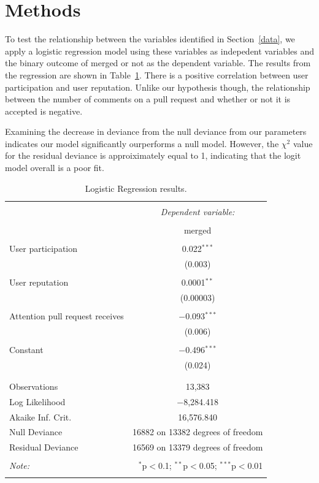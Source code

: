 \documentclass[12pt]{article}
\begin{document}
\section{Methods}\label{methods}
To test the relationship between the variables identified in Section~\ref{data},
we apply a logistic regression model using these variables as indepedent
variables and the binary outcome of merged or not as the dependent variable. The
results from the regression are shown in Table~\ref{logit}. There is a positive
correlation between user participation and user reputation. Unlike our
hypothesis though, the relationship between the number of comments on a pull
request and whether or not it is accepted is negative.

Examining the decrease in deviance from the null deviance from our parameters
indicates our model significantly ourperforms a null model. However, the
$\chi^{2}$ value for the residual deviance is approiximately equal to 1,
indicating that the logit model overall is a poor fit.


\begin{table}[!htbp] \centering
\caption{Logistic Regression results.}
\label{logit}
\begin{tabular}{@{\extracolsep{5pt}}lc}
\\[-1.8ex]\hline
\hline \\[-1.8ex]
& \multicolumn{1}{c}{\textit{Dependent variable:}} \\
\cline{2-2}
\\[-1.8ex] & merged \\
\hline \\[-1.8ex]
User participation & 0.022$^{***}$ \\
& (0.003) \\
& \\
User reputation & 0.0001$^{**}$ \\
& (0.00003) \\
& \\
Attention pull request receives & $-$0.093$^{***}$ \\
& (0.006) \\
& \\
Constant & $-$0.496$^{***}$ \\
& (0.024) \\
& \\
\hline \\[-1.8ex]
Observations & 13,383 \\
Log Likelihood & $-$8,284.418 \\
Akaike Inf. Crit. & 16,576.840 \\
Null Deviance & 16882  on 13382  degrees of freedom \\
Residual Deviance & 16569  on 13379  degrees of freedom \\
\hline
\hline \\[-1.8ex]
\textit{Note:}  & \multicolumn{1}{r}{$^{*}$p$<$0.1;
  $^{**}$p$<$0.05; $^{***}$p$<$0.01} \\
  \normalsize
  \end{tabular}
  \end{table}
\end{document}
